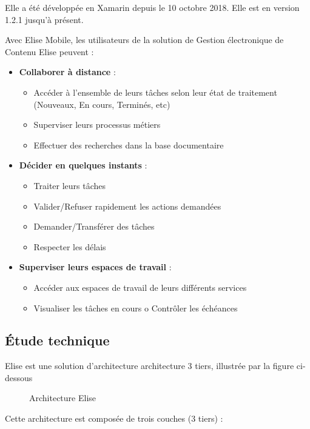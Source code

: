 Elle a été développée en Xamarin depuis le 10 octobre 2018. Elle est en version 1.2.1 jusqu'à présent.

Avec Elise Mobile, les utilisateurs de la solution de Gestion électronique de Contenu Elise peuvent :

\begin{itemize}

\item \textbf{Collaborer à distance} : 
  \begin{itemize}
  \item Accéder à l'ensemble de leurs tâches selon leur état de traitement (Nouveaux, En cours, Terminés, etc)
  \item Superviser leurs processus métiers
  \item Effectuer des recherches dans la base documentaire
  \end{itemize}
\item \textbf{Décider en quelques instants} :
  \begin{itemize}
  \item Traiter leurs tâches
  \item Valider/Refuser rapidement les actions demandées
  \item Demander/Transférer des tâches
  \item Respecter les délais
  \end{itemize}
\item \textbf{Superviser leurs espaces de travail} :
  \begin{itemize}
    \item Accéder aux espaces de travail de leurs différents services
    \item Visualiser les tâches en cours o Contrôler les échéances
  \end{itemize}
\end{itemize}


\subsection{Étude technique}
Elise est une solution d'architecture architecture 3 tiers, illustrée par la figure ci-dessous 
\begin{figure}[H]
  \centering
  \caption{Architecture Elise}
  \label{fig:architecture_elise}
\end{figure}
Cette architecture est composée de trois couches (3 tiers) :

